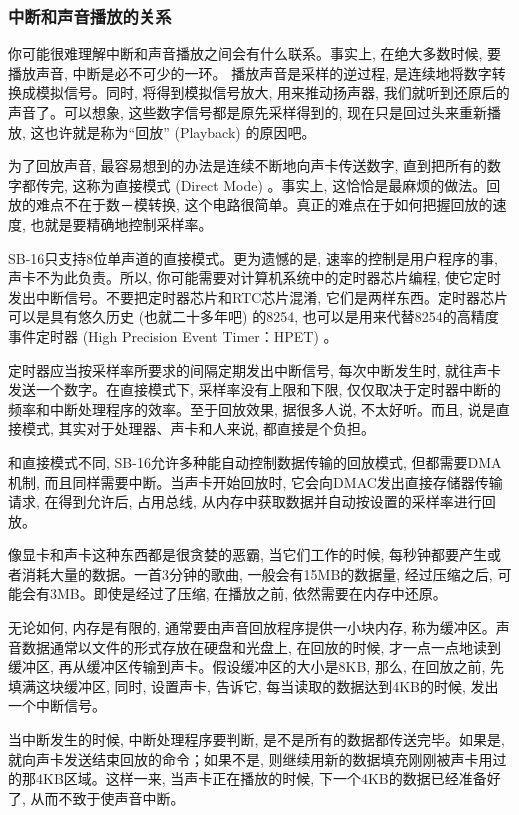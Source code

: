 \documentclass[12pt]{article}
\begin{document}
\begin{CJK}{UTF8}{gbsn}
\subsubsection{中断和声音播放的关系}

你可能很难理解中断和声音播放之间会有什么联系。事实上, 在绝大多数时候, 要播放声音, 中断是必不可少的一环。
播放声音是采样的逆过程, 是连续地将数字转换成模拟信号。同时, 将得到模拟信号放大, 用来推动扬声器, 我们就听到还原后的声音了。可以想象, 这些数字信号都是原先采样得到的, 现在只是回过头来重新播放, 这也许就是称为“回放” (Playback) 的原因吧。

为了回放声音, 最容易想到的办法是连续不断地向声卡传送数字, 直到把所有的数字都传完, 这称为直接模式 (Direct Mode) 。事实上, 这恰恰是最麻烦的做法。回放的难点不在于数－模转换, 这个电路很简单。真正的难点在于如何把握回放的速度, 也就是要精确地控制采样率。

SB-16只支持8位单声道的直接模式。更为遗憾的是, 速率的控制是用户程序的事, 声卡不为此负责。所以, 你可能需要对计算机系统中的定时器芯片编程, 使它定时发出中断信号。不要把定时器芯片和RTC芯片混淆, 它们是两样东西。定时器芯片可以是具有悠久历史 (也就二十多年吧) 的8254, 也可以是用来代替8254的高精度事件定时器 (High Precision Event Timer：HPET) 。

定时器应当按采样率所要求的间隔定期发出中断信号, 每次中断发生时, 就往声卡发送一个数字。在直接模式下, 采样率没有上限和下限, 仅仅取决于定时器中断的频率和中断处理程序的效率。至于回放效果, 据很多人说, 不太好听。而且, 说是直接模式, 其实对于处理器、声卡和人来说, 都直接是个负担。

和直接模式不同, SB-16允许多种能自动控制数据传输的回放模式, 但都需要DMA机制, 而且同样需要中断。当声卡开始回放时, 它会向DMAC发出直接存储器传输请求, 在得到允许后, 占用总线, 从内存中获取数据并自动按设置的采样率进行回放。

像显卡和声卡这种东西都是很贪婪的恶霸, 当它们工作的时候, 每秒钟都要产生或者消耗大量的数据。一首3分钟的歌曲, 一般会有15MB的数据量, 经过压缩之后, 可能会有3MB。即使是经过了压缩, 在播放之前, 依然需要在内存中还原。

无论如何, 内存是有限的, 通常要由声音回放程序提供一小块内存, 称为缓冲区。声音数据通常以文件的形式存放在硬盘和光盘上, 在回放的时候, 才一点一点地读到缓冲区, 再从缓冲区传输到声卡。假设缓冲区的大小是8KB, 那么, 在回放之前, 先填满这块缓冲区, 同时, 设置声卡, 告诉它, 每当读取的数据达到4KB的时候, 发出一个中断信号。

当中断发生的时候, 中断处理程序要判断, 是不是所有的数据都传送完毕。如果是, 就向声卡发送结束回放的命令；如果不是, 则继续用新的数据填充刚刚被声卡用过的那4KB区域。这样一来, 当声卡正在播放的时候, 下一个4KB的数据已经准备好了, 从而不致于使声音中断。


\end{CJK}
\end{document}
